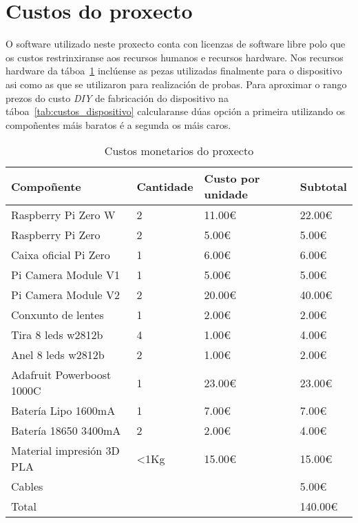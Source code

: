 \section{Custos do proxecto}
O software utilizado neste proxecto conta con licenzas de software libre polo que os custos restrinxiranse aos recursos humanos e recursos hardware.
Nos recursos hardware da táboa~\ref{tab:custos_hardware} inclúense as pezas utilizadas finalmente para o dispositivo asi como as que se utilizaron para realización de probas. Para aproximar o rango prezos do custo \emph{DIY} de fabricación do dispositivo  na táboa~\ref{tab:custos_dispositivo} calcularanse dúas opción a primeira utilizando os compoñentes máis baratos é a segunda os máis caros.


\begin{table}[tb]
    \label{tab:custos_hardware}
    \caption{Custos monetarios do proxecto}
    \begin{center}
        \begin{tabular}{|l|l|l|l|}
            \hline
             Compoñente & Cantidade & Custo por unidade & Subtotal\\ \hline
             Raspberry Pi Zero W & 2 & 11.00€ & 22.00€ \\ \hline
             Raspberry Pi Zero & 2 & 5.00€ & 5.00€ \\ \hline
             Caixa oficial Pi Zero & 1 & 6.00€ & 6.00€ \\ \hline
             Pi Camera Module V1 & 1 & 5.00€ & 5.00€ \\ \hline
             Pi Camera Module V2 & 2 & 20.00€ & 40.00€ \\ \hline
             Conxunto de lentes & 1 & 2.00€ & 2.00€ \\ \hline
             Tira 8 leds w2812b & 4 & 1.00€ & 4.00€\\ \hline
             Anel 8 leds w2812b & 2 & 1.00€ & 2.00€ \\ \hline
             Adafruit Powerboost 1000C & 1 & 23.00€ & 23.00€ \\ \hline
             Batería Lipo 1600mA & 1 & 7.00€ & 7.00€\\ \hline
             Batería 18650 3400mA & 2 & 2.00€ & 4.00€ \\ \hline
             Material impresión 3D PLA & <1Kg & 15.00€ & 15.00€ \\ \hline
             Cables &  &  & 5.00€ \\ \hline
             Total &  &  & 140.00€ \\ \hline
        \end{tabular}
    \end{center}
\end{table}

